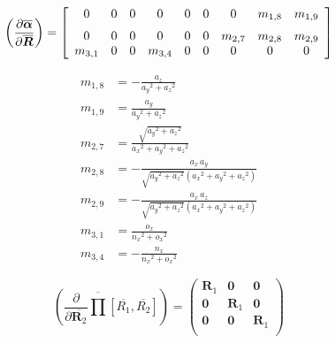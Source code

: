\documentclass[twocolumn,10pt]{IFTOMM}
\newcommand{\bm}[1]{\boldsymbol{#1}}
\begin{document}
\begin{equation}
\left(\frac{\partial \overline{\bm{\alpha}}}{\partial \overline{\bm{R}}}\right)
=
\left[ \begin {array}{ccccccccc} 0&0&0&0&0&0&0&m_{1,8}&m_{1,9}\\ 
\noalign{\medskip}0&0&0&0&0&0&m_{2,7}&m_{2,8}&m_{2,9}\\ 
m_{3,1}&0&0&m_{3,4}&0&0&0&0&0\end {array} \right] 
\end{equation}

\begin{align}
m_{1,8}&=-{\frac {{ a_z}}{{
            { a_y}}^{2}+{{ a_z}}^{2}}}\\
m_{1,9}&={\frac {{ a_y}}{{{ a_y}}^{2
        }+{{ a_z}}^{2}}}\\
m_{2,7}&={\frac {\sqrt {{{
                    a_y}}^{2}+{{ a_z}}^{2}}}{{{ a_x}}^{2}+{{ a_y}}^{2}+{{
                a_z}}^{2}}} \\
m_{2,8}&=-{\frac {{ a_x}\,{ a_y}}{\sqrt {{{ a_y}}^
            {2}+{{ a_z}}^{2}} \left( {{ a_x}}^{2}+{{ a_y}}^{2}+{{ 
                a_z}}^{2} \right) }}\\
m_{2,9}&=-{\frac {{ a_x}\,{ a_z}}{\sqrt {{{ 
                    a_y}}^{2}+{{ a_z}}^{2}} \left( {{ a_x}}^{2}+{{ a_y}}^{2}+
        {{ a_z}}^{2} \right) }}\\
m_{3,1}&=\frac {{ o_x}}{{{
            n_x}}^{2}+{{ o_x}}^{2}} \\
m_{3,4}&=-{\frac {{ n_x}}{{{ n_x}
        }^{2}+{{ o_x}}^{2}}}
\end{align}



\begin{equation}
\left(\frac{\partial }{\partial \overline{\bm{R}_2}}
\overline{\prod}\left[ \overline{R_1}, \overline{R_2}\right]\right)
=
\begin{pmatrix}
\bm{R}_1 & \bm{0} & \bm{0} \\
\bm{0} & \bm{R}_1 & \bm{0} \\
\bm{0} & \bm{0} & \bm{R}_1  \\
\end{pmatrix}
\end{equation}
\end{document}
